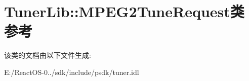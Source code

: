 \hypertarget{class_tuner_lib_1_1_m_p_e_g2_tune_request}{}\section{Tuner\+Lib\+:\+:M\+P\+E\+G2\+Tune\+Request类 参考}
\label{class_tuner_lib_1_1_m_p_e_g2_tune_request}


该类的文档由以下文件生成\+:\begin{DoxyCompactItemize}
\item 
E\+:/\+React\+O\+S-\/0../sdk/include/psdk/tuner.\+idl\end{DoxyCompactItemize}

